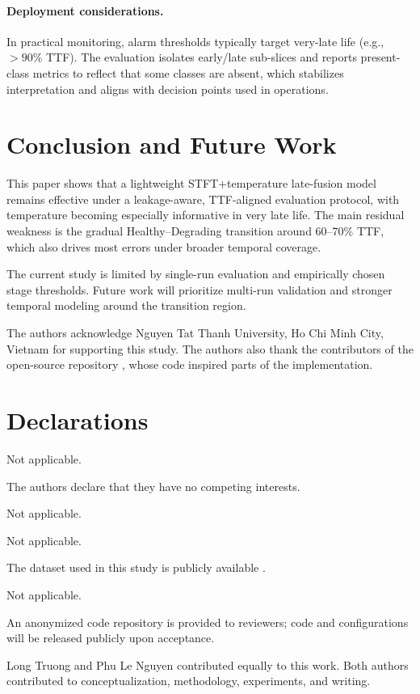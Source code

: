 \documentclass[pdflatex,sn-mathphys-num]{sn-jnl}%
\begin{document}
\paragraph{Deployment considerations.}
In practical monitoring, alarm thresholds typically target very-late life (e.g., $>90\%$ TTF). The evaluation isolates early/late sub-slices and reports present-class metrics to reflect that some classes are absent, which stabilizes interpretation and aligns with decision points used in operations.
\FloatBarrier


\section{Conclusion and Future Work}
\label{sec:conclusion}

This paper shows that a lightweight STFT+temperature late-fusion model remains effective under a leakage-aware, TTF-aligned evaluation protocol, with temperature becoming especially informative in very late life. The main residual weakness is the gradual Healthy--Degrading transition around 60--70\% TTF, which also drives most errors under broader temporal coverage.

The current study is limited by single-run evaluation and empirically chosen stage thresholds. Future work will prioritize multi-run validation and stronger temporal modeling around the transition region.

\backmatter
{}
The authors acknowledge Nguyen Tat Thanh University, Ho Chi Minh City, Vietnam for supporting this study. The authors also thank the contributors of the open-source repository \cite{mdzalfirdausi_paderborn_repo}, whose code inspired parts of the implementation.

\section*{Declarations}

Not applicable.

The authors declare that they have no competing interests.

Not applicable.

Not applicable.

The dataset used in this study is publicly available \cite{jung2024dib_rtf,jung2024mendeley_rtf}.

Not applicable.

An anonymized code repository is provided to reviewers; code and configurations will be released publicly upon acceptance.

Long Truong and Phu Le Nguyen contributed equally to this work. Both authors contributed to conceptualization, methodology, experiments, and writing.

\begingroup
\sloppy
\small

\endgroup
\end{document}
